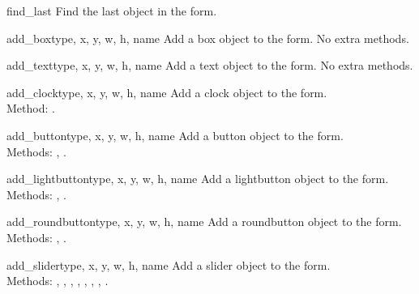 \begin{flushleft}
\begin{methoddesc}[form]{find_last}{}
  Find the last object in the form.
\end{methoddesc}


\begin{methoddesc}[form]{add_box}{type, x, y, w, h, name}
Add a box object to the form.
No extra methods.
\end{methoddesc}

\begin{methoddesc}[form]{add_text}{type, x, y, w, h, name}
Add a text object to the form.
No extra methods.
\end{methoddesc}


\begin{methoddesc}[form]{add_clock}{type, x, y, w, h, name}
Add a clock object to the form. \\
Method:
.
\end{methoddesc}


\begin{methoddesc}[form]{add_button}{type, x, y, w, h,  name}
Add a button object to the form. \\
Methods:
,
.
\end{methoddesc}

\begin{methoddesc}[form]{add_lightbutton}{type, x, y, w, h, name}
Add a lightbutton object to the form. \\
Methods:
,
.
\end{methoddesc}

\begin{methoddesc}[form]{add_roundbutton}{type, x, y, w, h, name}
Add a roundbutton object to the form. \\
Methods:
,
.
\end{methoddesc}


\begin{methoddesc}[form]{add_slider}{type, x, y, w, h, name}
Add a slider object to the form. \\
Methods:
,
,
,
,
,
,
,
.
\end{methoddesc}


\end{flushleft}
